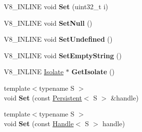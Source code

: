 \begin{DoxyCompactItemize}
\item 
\hypertarget{classv8_1_1_return_value_a9e190fff3c0396656e752ee916c715dc}{}V8\+\_\+\+I\+N\+L\+I\+N\+E void {\bfseries Set} (uint32\+\_\+t i)\label{classv8_1_1_return_value_a9e190fff3c0396656e752ee916c715dc}

\item 
\hypertarget{classv8_1_1_return_value_aba8480ee94ea905ad0850b3ceaf1b9b1}{}V8\+\_\+\+I\+N\+L\+I\+N\+E void {\bfseries Set\+Null} ()\label{classv8_1_1_return_value_aba8480ee94ea905ad0850b3ceaf1b9b1}

\item 
\hypertarget{classv8_1_1_return_value_af73d4ed15f126a214efe583ac56ff19d}{}V8\+\_\+\+I\+N\+L\+I\+N\+E void {\bfseries Set\+Undefined} ()\label{classv8_1_1_return_value_af73d4ed15f126a214efe583ac56ff19d}

\item 
\hypertarget{classv8_1_1_return_value_a3ed4f59f726eafae53525bb68512b93e}{}V8\+\_\+\+I\+N\+L\+I\+N\+E void {\bfseries Set\+Empty\+String} ()\label{classv8_1_1_return_value_a3ed4f59f726eafae53525bb68512b93e}

\item 
\hypertarget{classv8_1_1_return_value_a8744931ca4536bcc2f95e344072a3f03}{}V8\+\_\+\+I\+N\+L\+I\+N\+E \hyperlink{classv8_1_1_isolate}{Isolate} $\ast$ {\bfseries Get\+Isolate} ()\label{classv8_1_1_return_value_a8744931ca4536bcc2f95e344072a3f03}

\item 
\hypertarget{classv8_1_1_return_value_a2ff02f4be7d7fdcf0e21be43dfd4fe43}{}{\footnotesize template$<$typename S $>$ }\\void {\bfseries Set} (const \hyperlink{classv8_1_1_persistent}{Persistent}$<$ S $>$ \&handle)\label{classv8_1_1_return_value_a2ff02f4be7d7fdcf0e21be43dfd4fe43}

\item 
\hypertarget{classv8_1_1_return_value_a523c0ab2f3bed6038943f71474e12b87}{}{\footnotesize template$<$typename S $>$ }\\void {\bfseries Set} (const \hyperlink{classv8_1_1_handle}{Handle}$<$ S $>$ handle)\label{classv8_1_1_return_value_a523c0ab2f3bed6038943f71474e12b87}

\end{DoxyCompactItemize}
